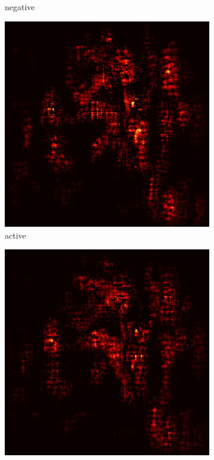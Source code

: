 \documentclass[preprint,12pt]{elsarticle}
\begin{document}
\begin{figure}
\begin{subfigure}{0.14\textwidth}
        \caption{negative}
    \end{subfigure}
    \hfill
    \begin{subfigure}{0.14\textwidth}
        \centering
        \includegraphics[width=\linewidth]{../visualizations/examples/imagenette/cnn/active_saliency_map/3.png}
        \caption{active}
    \end{subfigure}
    \hfill
    \begin{subfigure}{0.14\textwidth}
        \centering
        \includegraphics[width=\linewidth]{../visualizations/examples/imagenette/cnn/inactive_saliency_map/3.png}

\end{subfigure}
\end{figure}
\end{document}
